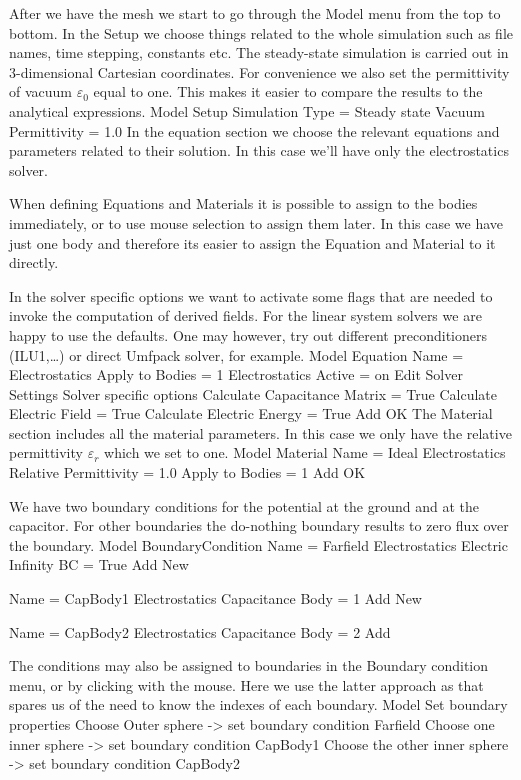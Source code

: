 After we have the mesh we start to go through the Model menu from the top to bottom. 
In the Setup we choose things related to the whole simulation such as file names, 
time stepping, constants etc.
The steady-state simulation is carried out in 3-dimensional Cartesian
coordinates. For convenience we also set the permittivity of vacuum $\varepsilon_0$ equal to one.
This makes it easier to compare the results to the analytical expressions. 
\ttbegin
Model
  Setup 
    Simulation Type = Steady state
    Vacuum Permittivity = 1.0
\ttend
In the equation section we choose the relevant equations and parameters related to their solution. 
In this case we'll have only the electrostatics solver. 

When defining Equations and Materials it is possible to assign to the bodies immediately, or to use mouse
selection to assign them later. In this case we have just one body and therefore its easier to assign 
the Equation and Material to it directly.

In the solver specific options we want to activate some flags that are needed to invoke the 
computation of derived fields. 
For the linear system solvers we are happy to use the defaults. One may however, try out different
preconditioners (ILU1,\ldots) or direct Umfpack solver, for example.
\ttbegin
Model
  Equation
    Name = Electrostatics
    Apply to Bodies = 1
    Electrostatics
      Active = on
      Edit Solver Settings
        Solver specific options
          Calculate Capacitance Matrix = True
          Calculate Electric Field = True
          Calculate Electric Energy = True
    Add 
    OK
\ttend        
The Material section includes all the material parameters.
In this case we only have the relative permittivity $\varepsilon_r$ which we set to one.
\ttbegin
Model
  Material
    Name = Ideal
    Electrostatics
      Relative Permittivity = 1.0
    Apply to Bodies = 1 
    Add
    OK
\ttend

We have two boundary conditions for the potential at the ground and at the capacitor. For other boundaries
the do-nothing boundary results to zero flux over the boundary.
\ttbegin
Model
  BoundaryCondition
    Name = Farfield
    Electrostatics
      Electric Infinity BC = True
    Add
    New

    Name = CapBody1
    Electrostatics
      Capacitance Body = 1
    Add
    New

    Name = CapBody2
    Electrostatics
      Capacitance Body = 2
    Add
\ttend   

The conditions may also be assigned to boundaries in the Boundary condition menu, or 
by clicking with the mouse. Here we use the latter approach as that spares us of the 
need to know the indexes of each boundary.
\ttbegin
Model
  Set boundary properties
    Choose Outer sphere -> set boundary condition Farfield
    Choose one inner sphere -> set boundary condition CapBody1
    Choose the other inner sphere -> set boundary condition CapBody2
\ttend

